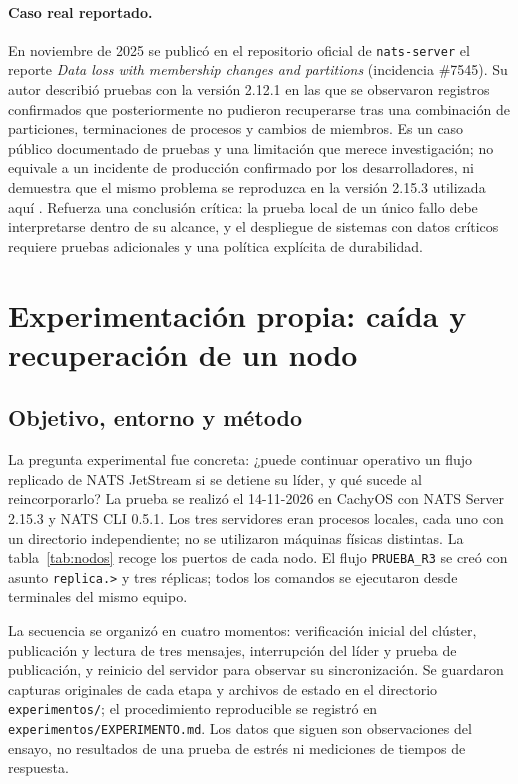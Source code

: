 \documentclass[12pt,a4paper]{article}
\begin{document}
\paragraph{Caso real reportado.}
En noviembre de 2025 se publicó en el repositorio oficial de \texttt{nats-server} el reporte \emph{Data loss with membership changes and partitions} (incidencia \#7545). Su autor describió pruebas con la versión 2.12.1 en las que se observaron registros confirmados que posteriormente no pudieron recuperarse tras una combinación de particiones, terminaciones de procesos y cambios de miembros. Es un caso público documentado de pruebas y una limitación que merece investigación; no equivale a un incidente de producción confirmado por los desarrolladores, ni demuestra que el mismo problema se reproduzca en la versión 2.15.3 utilizada aquí \cite{natsincident2025}. Refuerza una conclusión crítica: la prueba local de un único fallo debe interpretarse dentro de su alcance, y el despliegue de sistemas con datos críticos requiere pruebas adicionales y una política explícita de durabilidad.



\section{Experimentación propia: caída y recuperación de un nodo}
\subsection{Objetivo, entorno y método}
La pregunta experimental fue concreta: ¿puede continuar operativo un flujo replicado de NATS JetStream si se detiene su líder, y qué sucede al reincorporarlo? La prueba se realizó el 14-11-2026 en CachyOS con NATS Server 2.15.3 y NATS CLI 0.5.1. Los tres servidores eran procesos locales, cada uno con un directorio independiente; no se utilizaron máquinas físicas distintas. La tabla~\ref{tab:nodos} recoge los puertos de cada nodo. El flujo \texttt{PRUEBA\_R3} se creó con asunto \texttt{replica.>} y tres réplicas; todos los comandos se ejecutaron desde terminales del mismo equipo.

La secuencia se organizó en cuatro momentos: verificación inicial del clúster, publicación y lectura de tres mensajes, interrupción del líder y prueba de publicación, y reinicio del servidor para observar su sincronización. Se guardaron capturas originales de cada etapa y archivos de estado en el directorio \texttt{experimentos/}; el procedimiento reproducible se registró en \texttt{experimentos/EXPERIMENTO.md}. Los datos que siguen son observaciones del ensayo, no resultados de una prueba de estrés ni mediciones de tiempos de respuesta.
\end{document}
